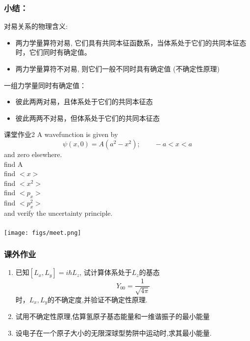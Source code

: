 \begin{frame}[label=current]
    \frametitle{小结：}
    对易关系的物理含义:
    \begin{itemize}
      \item 两力学量算符对易, 它们具有共同本征函数系，当体系处于它们的共同本征态时，它们同时有确定值。
      \item 两力学量算符不对易, 则它们一般不同时具有确定值 (不确定性原理)
    \end{itemize}
      一组力学量同时有确定值：
    \begin{itemize}
      \item 彼此两两对易，且体系处于它们的共同本征态
      \item 彼此两两不对易，但体系处于它们的共同本征态 
    \end{itemize}
  \end{frame} 

\begin{frame} {}
    \begin{atcbox}{课堂作业2}
     A wavefunction is given by \[ \psi(x,0)=A\left(a^2-x^2\right); \qquad -a<x<a \]
    and zero elsewhere.\\
    find A \\
    find $<x>$\\
    find $<x^2>$\\
    find $<p_x>$\\
    find $<p_x^ 2>$\\
    and verify the uncertainty principle. \\
    \end{atcbox}
\end{frame} 

\begin{frame} 
    \frametitle{}
    \texttt{[image: figs/meet.png]}
\end{frame} 

\begin{frame}
    \frametitle{课外作业}
    \begin{enumerate}
        \item 已知$[L_x, L_y]=i\hbar L_z$, 试计算体系处于$L_z$的基态 $$Y_{00}=\frac{1}{\sqrt{4\pi}}$$时，$L_x, L_y$的不确定度,并验证不确定性原理.
        \item 试用不确定性原理,估算氢原子基态能量和一维谐振子的最小能量
        \item 设电子在一个原子大小的无限深球型势阱中运动时,求其最小能量.
    \end{enumerate}
\end{frame}

